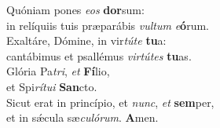 \evenverse Quóniam pones \textit{e}\textit{os} \textbf{dor}sum:~\*\\
\evenverse in relíquiis tuis præparábis \textit{vul}\textit{tum} \textit{e}\textbf{ó}rum.\\
\oddverse Exaltáre, Dómine, in vir\textit{tú}\textit{te} \textbf{tu}a:~\*\\
\oddverse cantábimus et psallémus \textit{vir}\textit{tú}\textit{tes} \textbf{tu}as.\\
\evenverse Glória Pa\textit{tri}, \textit{et} \textbf{Fí}lio,~\*\\
\evenverse et Spi\textit{rí}\textit{tu}\textit{i} \textbf{San}cto.\\
\oddverse Sicut erat in princípio, et \textit{nunc}, \textit{et} \textbf{sem}per,~\*\\
\oddverse et in sǽcula sæ\textit{cu}\textit{ló}\textit{rum}. \textbf{A}men.\\
